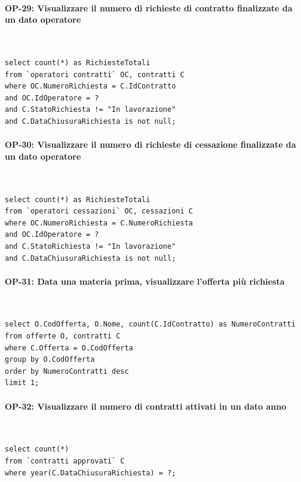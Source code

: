 \documentclass[a4paper,12pt]{report}
\begin{document}
\paragraph{OP-29: Visualizzare il numero di richieste di contratto finalizzate da un dato operatore}\mbox{}\\
\begin{lstlisting}
select count(*) as RichiesteTotali
from `operatori contratti` OC, contratti C
where OC.NumeroRichiesta = C.IdContratto
and OC.IdOperatore = ?
and C.StatoRichiesta != "In lavorazione"
and C.DataChiusuraRichiesta is not null;
\end{lstlisting}

\paragraph{OP-30: Visualizzare il numero di richieste di cessazione finalizzate da un dato operatore}\mbox{}\\
\begin{lstlisting}
select count(*) as RichiesteTotali
from `operatori cessazioni` OC, cessazioni C
where OC.NumeroRichiesta = C.NumeroRichiesta
and OC.IdOperatore = ?
and C.StatoRichiesta != "In lavorazione"
and C.DataChiusuraRichiesta is not null;
\end{lstlisting}

\paragraph{OP-31: Data una materia prima, visualizzare l'offerta più richiesta}\mbox{}\\
\begin{lstlisting}
select O.CodOfferta, O.Nome, count(C.IdContratto) as NumeroContratti
from offerte O, contratti C
where C.Offerta = O.CodOfferta
group by O.CodOfferta
order by NumeroContratti desc
limit 1;

\end{lstlisting}

\paragraph{OP-32: Visualizzare il numero di contratti attivati in un dato anno}\mbox{}\\
\begin{lstlisting}
select count(*)
from `contratti approvati` C
where year(C.DataChiusuraRichiesta) = ?;
\end{lstlisting}
\end{document}

